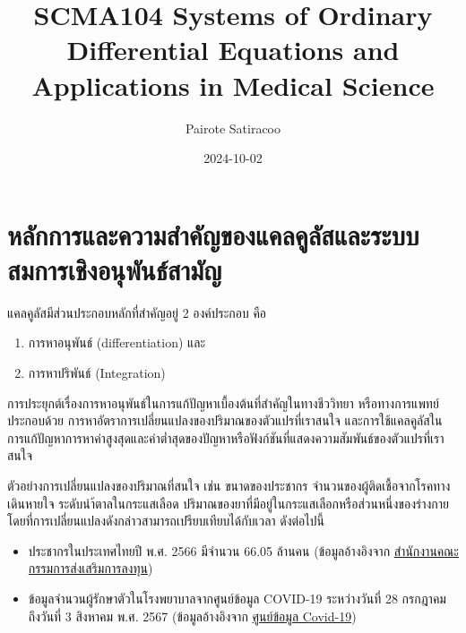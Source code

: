 \documentclass[
]{book}
\title{SCMA104 Systems of Ordinary Differential Equations and
Applications in Medical Science}
\author{Pairote Satiracoo}
\date{2024-10-02}
\begin{document}
\frontmatter
\maketitle

{
\setcounter{tocdepth}{1}
\tableofcontents
}
\mainmatter
\chapter{หลักการและความสำคัญของแคลคูลัสและระบบสมการเชิงอนุพันธ์สามัญ}\label{uxe2buxe25uxe01uxe01uxe32uxe23uxe41uxe25uxe30uxe04uxe27uxe32uxe21uxe2auxe33uxe04uxe0duxe02uxe2duxe07uxe41uxe04uxe25uxe04uxe25uxe2auxe41uxe25uxe30uxe23uxe30uxe1auxe1auxe2auxe21uxe01uxe32uxe23uxe40uxe0auxe07uxe2duxe19uxe1euxe19uxe18uxe2auxe32uxe21uxe0d}

แคลคูลัสมีส่วนประกอบหลักที่สำคัญอยู่ 2 องค์ประกอบ คือ

\begin{enumerate}
\def\labelenumi{\arabic{enumi}.}
\item
  การหาอนุพันธ์ (differentiation) และ
\item
  การหาปริพันธ์ (Integration)
\end{enumerate}

การประยุกต์เรื่องการหาอนุพันธ์ในการแก้ปัญหาเบื้องต้นที่สำคัญในทางชีววิทยา หรือทางการแพทย์
ประกอบด้วย การหาอัตราการเปลี่ยนแปลงของปริมาณของตัวแปรที่เราสนใจ
และการใช้แคลคูลัสในการแก้ปัญหาการหาค่าสูงสุดและค่าต่ำสุดของปัญหาหรือฟังก์ชันที่แสดงความสัมพันธ์ของตัวแปรที่เราสนใจ

ตัวอย่างการเปลี่ยนแปลงของปริมาณที่สนใจ เช่น ขนาดของประชากร
จำนวนของผู้ติดเชื้อจากโรคทางเดินหายใจ ระดับนำ้ตาลในกระแสเลือด
ปริมาณของยาที่มีอยู่ในกระแสเลือกหรือส่วนหนึ่งของร่างกาย
โดยที่การเปลี่ยนแปลงดังกล่าวสามารถเปรียบเทียบได้กับเวลา ดังต่อไปนี้

\begin{itemize}
\item
  ประชากรในประเทศไทยปี พ.ศ. 2566 มีจำนวน 66.05 ล้านคน (ข้อมูลอ้างอิงจาก
  \href{https://www.boi.go.th/index.php?page=demographic}{สำนักงานคณะกรรมการส่งเสริมการลงทุน})
\item
  ข้อมูลจำนวนผู้รักษาตัวในโรงพยาบาลจากศูนย์ข้อมูล COVID-19 ระหว่างวันที่ 28 กรกฎาคม
  ถึงวันที่ 3 สิงหาคม พ.ศ. 2567 (ข้อมูลอ้างอิงจาก
  \href{https://www.facebook.com/informationcovid19?locale=th_TH}{ศูนย์ข้อมูล
  Covid-19})
\end{itemize}
\end{document}
